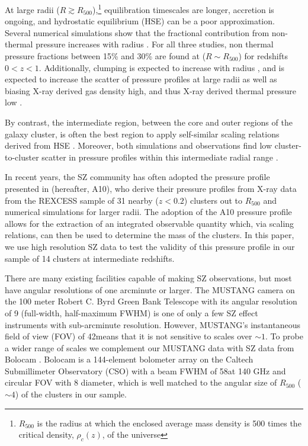 \documentclass[iop,numberedappendix,apj]{emulateapj}
\begin{document}
At large radii ($R \gtrsim R_{500}$),\footnote{$R_{500}$ is the radius at which the enclosed average mass density is 
500 times the critical density, $\rho_c(z)$, of the universe} equilibration timescales are longer, accretion is ongoing, 
and hydrostatic equilibrium (HSE) can be a poor approximation. Several numerical simulations show that the fractional contribution
from non-thermal pressure increases with radius \citep{shaw2010,battaglia2012,nelson2014}. 
For all three studies, non thermal pressure fractions between 15\% and 30\% are found at ($R \sim R_{500}$)
for redshifts $0 < z < 1$. Additionally, clumping is expected to increase with radius \citep{kravtsov2012}, and is expected to
increase the scatter of pressure profiles at large radii \citep{nagai2011} as well as biasing X-ray derived gas density high,
and thus X-ray derived thermal pressure low \citep{battaglia2015}.

By contrast, the intermediate region, between the core and outer regions of the galaxy cluster, 
is often the best region to apply self-similar scaling relations derived from HSE \citep[e.g.][]{kravtsov2012}. 
Moreover, both simulations and observations find low
cluster-to-cluster scatter in pressure profiles within this intermediate radial range \citep[e.g.][]{borgani2004,
nagai2007,arnaud2010,bonamente2012,planck2013a,sayers2013}.

In recent years, the SZ community has often adopted the pressure profile
presented in \citet{arnaud2010} (hereafter, A10), who derive their pressure profiles from X-ray data from the 
REXCESS sample of 31 nearby ($z < 0.2$) clusters out to $R_{500}$ and numerical simulations for larger radii. The
adoption of the A10 pressure profile allows for the extraction of an integrated observable quantity which,
via scaling relations, can then be used to determine the mass of the clusters. In this paper, we use high resolution
SZ data to test the validity of this pressure profile in our sample of 14 clusters at intermediate redshifts.

There are many existing facilities capable of making SZ observations, but most have
angular resolutions of one arcminute or larger. The MUSTANG camera \citep{dicker2008}
on the 100 meter Robert C. Byrd Green Bank Telescope \citep[GBT, ][]{jewell2004} with its angular resolution of 9\asec 
(full-width, half-maximum FWHM) is one of only a few SZ effect instruments with sub-arcminute resolution.
However, MUSTANG's instantaneous field of view (FOV) of 42\asecs means that it is not sensitive to scales over $\sim1$\amin. 
To probe a wider range of scales we complement our MUSTANG data with SZ data from Bolocam \citep{glenn1998}. 
Bolocam is a 144-element bolometer
array on the Caltech Submillimeter Observatory (CSO) with a beam FWHM of 58\asecs at 140 GHz and circular FOV with 8\amins 
diameter, which is well matched to the angular size of $R_{500}$ ($\sim 4$\amin) of the clusters in our sample. 
\end{document}

